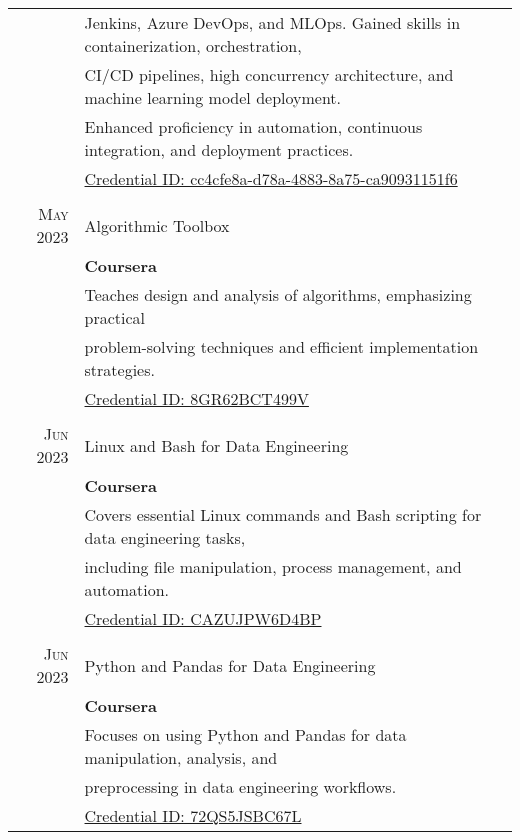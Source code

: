 \documentclass[a4paper,10pt]{article} %
\begin{document}
\begin{tabular}{r|l}
& \small Jenkins, Azure DevOps, and MLOps. Gained skills in containerization, orchestration,\\
& \small CI/CD pipelines, high concurrency architecture, and machine learning model deployment.\\
& \small Enhanced proficiency in automation, continuous integration, and deployment practices.\\
& \small \href{https://platzi.com/p/larajuan/learning-path/8353-cloud-devops/diploma/detalle/}{Credential ID: cc4cfe8a-d78a-4883-8a75-ca90931151f6}\\
\\
\textsc{May} 2023 & Algorithmic Toolbox\\
& \normalsize\textbf{Coursera}\\
& \small Teaches design and analysis of algorithms, emphasizing practical\\
& \small problem-solving techniques and efficient implementation strategies.\\
& \small \href{https://www.coursera.org/account/accomplishments/certificate/8GR62BCT499V}{Credential ID: 8GR62BCT499V}\\
\\
\textsc{Jun} 2023 & Linux and Bash for Data Engineering\\
& \normalsize\textbf{Coursera}\\
& \small Covers essential Linux commands and Bash scripting for data engineering tasks,\\
& \small including file manipulation, process management, and automation.\\
& \small \href{https://www.coursera.org/account/accomplishments/certificate/CAZUJPW6D4BP}{Credential ID: CAZUJPW6D4BP}\\
\\
\textsc{Jun} 2023 & Python and Pandas for Data Engineering\\
& \normalsize\textbf{Coursera}\\
& \small Focuses on using Python and Pandas for data manipulation, analysis, and\\
& \small preprocessing in data engineering workflows.\\
& \small \href{https://www.coursera.org/account/accomplishments/certificate/72QS5JSBC67L}{Credential ID: 72QS5JSBC67L}\\
\end{tabular}

\end{document}
